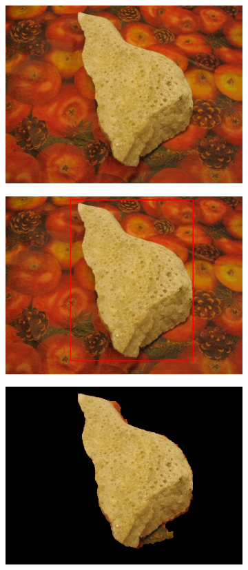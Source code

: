 \documentclass[a4paper,11]{article}
\begin{document}
  \begin{center}
  \begin{figure}[H]
    \begin{subfigure}{.33\textwidth}
      \centering
      \includegraphics[width=0.9\linewidth]{images/stone2.jpg}
    \end{subfigure}
    \begin{subfigure}{.33\textwidth}
      \centering
      \includegraphics[width=0.9\linewidth]{results/input/stone2}
    \end{subfigure}
    \begin{subfigure}{0.33\textwidth}
      \centering
      \includegraphics[width=0.9\linewidth]{results/stone2}

\end{subfigure}
\end{figure}
\end{center}
\end{document}
